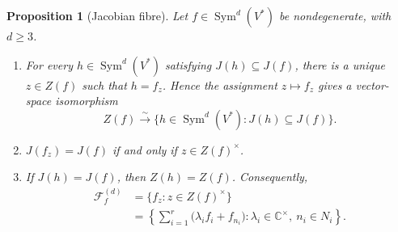 \documentclass[11pt,reqno]{amsart}
\numberwithin{equation}{section}
\newtheorem{proposition}[theorem]{Proposition}
\theoremstyle{definition}
\theoremstyle{remark}
\newcommand{\C}{\mathbb C}
\newcommand{\Sym}{\operatorname{Sym}}
\newcommand{\cF}{\mathcal F}
\begin{document}
\begin{proposition}[Jacobian fibre]\label{prop:Jacobian-fibre}
Let $f\in\Sym^d(V^*)$ be nondegenerate, with $d\geq3$.
\begin{enumerate}[label=\textup{(\roman*)},leftmargin=0.9cm]
\item For every $h\in\Sym^d(V^*)$ satisfying
$J(h)\subseteq J(f)$, there is a unique $z\in Z(f)$ such that $h=f_z$. Hence the assignment $z\mapsto f_z$ gives a vector-space
isomorphism
\begin{equation}\label{eq:center-linear-fibre}
  Z(f)\xrightarrow{\sim}
  \{h\in\Sym^d(V^*):J(h)\subseteq J(f)\}.
\end{equation}
\item $J(f_z)=J(f)$ if and only if $z\in Z(f)^\times$.
\smallskip

\item If $J(h)=J(f)$, then $Z(h)=Z(f)$. Consequently,
\begin{equation}\label{eq:homogeneous-fibre}
\begin{aligned}
  \cF_f^{(d)}&=\{f_z:z\in Z(f)^\times\}\\
  &=\left\{
     \sum_{i=1}^r\bigl(\lambda_i f_i+f_{n_i}\bigr):
     \lambda_i\in\C^\times,\ n_i\in N_i
    \right\}.
\end{aligned}
\end{equation}
\end{enumerate}

\end{proposition}
\end{document}
